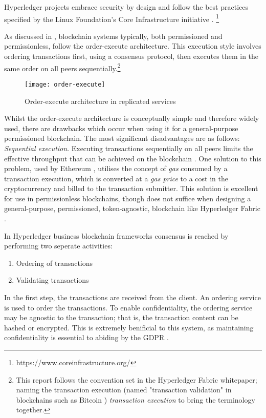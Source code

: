 Hyperledger projects embrace security by design and follow the best practices specified by the Linux Foundation's Core Infrastructure initiative \cite{noauthor_hyperledger_2017}. \footnote{https://www.coreinfrastructure.org/}

As discussed in \cite{androulaki_hyperledger_2018}, blockchain systems typically, both permissioned and permissionless, follow the order-execute architecture. 
This execution style involves ordering transactions first, using a consensus protocol, then executes them in the same order on all peers sequentially.\footnote{This report follows the convention set in the Hyperledger Fabric whitepaper; naming the transaction execution (named "transaction validation" in blockchains such as Bitcoin \cite{nakamoto_bitcoin_2019}) \emph{transaction execution} to bring the terminology together.}
\begin{figure}[H]
  \texttt{[image: order-execute]}
  \caption{Order-execute architecture in replicated services}
\end{figure}

Whilst the order-execute architecture is conceptually simple and therefore widely used, there are drawbacks which occur when using it for a general-purpose permissioned blockchain.\cite{androulaki_hyperledger_2018}
The most significant disadvantages are as follows: 
\emph{Sequential execution}. Executing transactions sequentially on all peers limits the effective throughput that can be achieved on the blockchain \cite{androulaki_hyperledger_2018}.
One solution to this problem, used by Ethereum \cite{wood_ethereum_nodate}, utilises the concept of \emph{gas} consumed by a transaction execution, which is converted at a \emph{gas price} to a cost in the cryptocurrency and billed to the transaction submitter.
This solution is excellent for use in permissionless blockchains, though does not suffice when designing a general-purpose, permissioned, token-agnostic, blockchain like Hyperledger Fabric \cite{androulaki_hyperledger_2018}.

In Hyperledger business blockchain frameworks consensus is reached by performing two seperate activities:
\begin{enumerate}
  \item Ordering of transactions
  \item Validating transactions
\end{enumerate}
In the first step, the transactions are received from the client.
An ordering service is used to order the transactions. 
To enable confidentiality, the ordering service may be agnostic to the transaction; that is, the transaction content can be hashed or encrypted.\cite{noauthor_hyperledger_2017}
This is extremely benificial to this system, as maintaining confidentiality is essential to abiding by the GDPR \cite{noauthor_general_nodate}.

